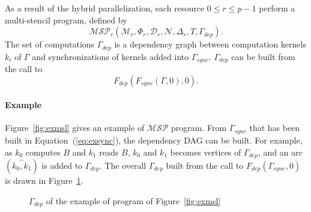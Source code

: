 As a result of the hybrid parallelization, each resource $0 \leq r \leq p-1$ perform a multi-stencil program, defined by
\begin{equation*}
\mathcal{MSP}_r(\mathcal{M}_r,\Phi_r,\mathcal{D}_r,\mathcal{N},\Delta_r,T,\Gamma_{dep}).
\end{equation*}
The set of computations $\Gamma_{dep}$ is a dependency graph between computation kernels $k_i$ of $\Gamma$ and synchronizations of kernels added into $\Gamma_{sync}$. $\Gamma_{dep}$ can be built from the call to 
\begin{equation*}
F_{dep}(F_{sync}(\Gamma,0),0).
\end{equation*}

\paragraph{\textbf{Example}} Figure~\ref{fig:exmsl} gives an example of $\mathcal{MSP}$ program. From $\Gamma_{sync}$ that has been built in Equation~(\ref{eq:exsync}), the dependency DAG can be built. For example, as $k_0$ computes $B$ and $k_1$ reads $B$, $k_0$ and $k_1$ becomes vertices of $\Gamma_{dep}$, and an arc $(\overset{\frown}{k_0,k_1})$ is added to $\Gamma_{dep}$. The overall $\Gamma_{dep}$ built from the call to $F_{dep}(\Gamma_{sync},0)$ is drawn in Figure~\ref{fig:depdep}.
\begin{figure}[h!]
\begin{center}
\caption{$\Gamma_{dep}$ of the example of program of Figure~\ref{fig:exmsl}}
\label{fig:depdep}
\end{center}
\end{figure}